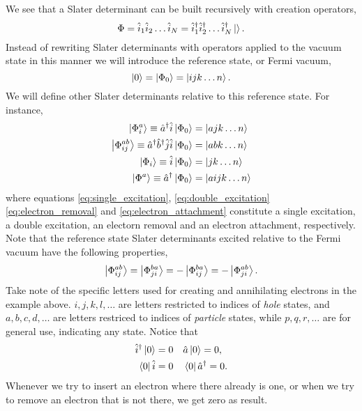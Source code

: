		We see that a Slater determinant can be built recursively with creation operators,
		\begin{equation}
			\Phi = \hat{i}_1\hat{i}_2\dots \hat{i}_N 
				= \hat{i}_1^\dagger \hat{i}_2^\dagger \dots \hat{i}_N^\dagger\ket{}.
		\end{equation}
		Instead of rewriting Slater determinants with operators applied to the vacuum 
		state in this manner we will introduce the reference state, or 
		Fermi vacuum,
		\begin{equation}
			\ket{0} = \ket{\Phi_0} = \ket{ijk\dots n}. 
		\end{equation}
		We will define other Slater determinants relative to this reference state.
		For instance,
		\begin{align}
		\label{eq:single_excitation}
		\ket{\Phi^a_i} \equiv \hat{a}^\dagger \hat{i}\ket{\Phi_0} &= \ket{ajk\dots n} \\
		\label{eq:double_excitation}
		\ket{\Phi^{ab}_{ij}} \equiv \hat{a}^\dagger\hat{b}^\dagger \hat{j} \hat{i}\ket{\Phi_0}
			&= \ket{abk\dots n} \\
		\label{eq:electron_removal}
		\ket{\Phi_i} \equiv \hat{i}\ket{\Phi_0} &= \ket{jk\dots n} \\
		\label{eq:electron_attachment}
		\ket{\Phi^a} \equiv \hat{a}^\dagger \ket{\Phi_0} &= \ket{aijk\dots n}
		\end{align}
		where equations \ref{eq:single_excitation}, \ref{eq:double_excitation}
		\ref{eq:electron_removal} and \ref{eq:electron_attachment}
		constitute a single excitation, a double excitation, an electorn removal and an
        electron attachment, respectively. Note that the reference state Slater
        determinants excited relative to the Fermi vacuum have the following
        properties,
		\begin{equation}
			\ket{\Phi^{ab}_{ij}} = \ket{\Phi^{ba}_{ji}}
				= - \ket{\Phi^{ba}_{ij}} = - \ket{\Phi^{ab}_{ji}}.
		\end{equation}
		Take note of the specific letters used for creating and annihilating electrons 
		in the example above. $i,j,k,l,\dots$ are letters restricted to indices of 
		\emph{hole} states, and $a,b,c,d,\dots$ are letters restriced to indices of
		\emph{particle} states, while $p,q,r,\dots$ are for general use, indicating 
		any state. Notice that
		\begin{equation}
			\begin{aligned}
				\hat{i}^\dagger\ket{0} = 0 &\quad \hat{a}\ket{0} = 0, \\
				\bra{0}\hat{i} = 0 &\quad \bra{0}\hat{a}^\dagger = 0.
			\end{aligned}	
		\end{equation}
		Whenever we try to insert an electron where there already is one, or when we 
		try to remove an electron that is not there, we get zero as result.

